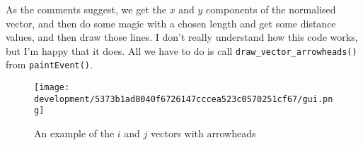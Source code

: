 \documentclass[../main.tex]{subfiles}
\begin{document}

As the comments suggest, we get the $x$ and $y$ components of the normalised vector, and then do some magic with a chosen length and get some distance values, and then draw those lines. I don't really understand how this code works, but I'm happy that it does. All we have to do is call \texttt{draw\_vector\_arrowheads()} from \texttt{paintEvent()}.

\begin{figure}[H]
	\centering
	\texttt{[image: development/5373b1ad8040f6726147cccea523c0570251cf67/gui.png]}
	\caption{An example of the $i$ and $j$ vectors with arrowheads}
	\label{fig:development:5373b1ad8040f6726147cccea523c0570251cf67:gui.png}
\end{figure}
\end{document}
